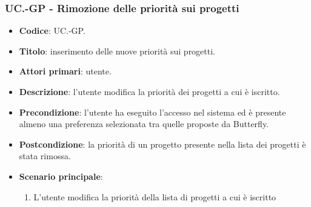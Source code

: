     \subsubsection{UC\theuccount.\thesubuccount-GP - Rimozione delle priorità sui progetti}
    
    \begin{itemize}
        \item \textbf{Codice}: UC\theuccount.\thesubuccount-GP.
        \item \textbf{Titolo}: inserimento delle nuove priorità sui progetti.
        \item \textbf{Attori primari}: utente.
        \item \textbf{Descrizione}: l'utente modifica la priorità dei progetti a cui è iscritto.
        \item \textbf{Precondizione}: l’utente ha eseguito l'accesso nel sistema ed è presente almeno
        una preferenza selezionata tra quelle proposte da Butterfly.
        \item \textbf{Postcondizione}: la priorità di un progetto presente nella lista dei progetti è stata rimossa.
        \item \textbf{Scenario principale}:
        \begin{enumerate}
            \item L'utente modifica la priorità della lista di progetti a cui è iscritto
        \end{enumerate}
    \end{itemize}

